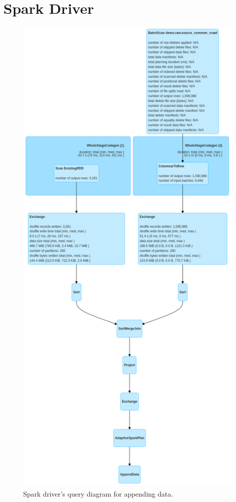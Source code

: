 \clearpage
\section{Spark Driver}
\label{sec:appendix-spark}

\begin{figure}[H]
    \centering
    \includegraphics[height=0.9\textheight]{figures/driver-query.png}
    \caption{Spark driver's query diagram for appending data.}
    \label{fig:analysis-pipeline-performance-driver}
\end{figure}


